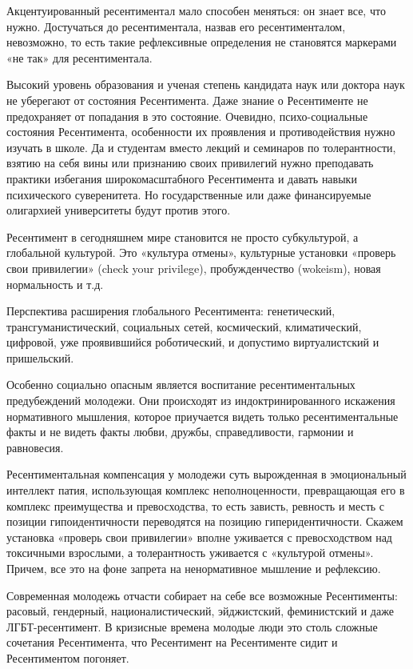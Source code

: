 Акцентуированный ресентиментал мало способен меняться: он знает все, что нужно.
Достучаться до ресентиментала, назвав его ресентименталом, невозможно, то есть
такие рефлексивные определения не становятся маркерами «не так» для
ресентиментала.

Высокий уровень образования и ученая степень кандидата наук или доктора наук не
уберегают от состояния Ресентимента. Даже знание о Ресентименте не предохраняет
от попадания в это состояние. Очевидно, психо-социальные состояния
Ресентимента, особенности их проявления и противодействия нужно изучать в
школе. Да и студентам вместо лекций и семинаров по толерантности, взятию на
себя вины или признанию своих привилегий нужно преподавать практики избегания
широкомасштабного Ресентимента и давать навыки психического суверенитета. Но
государственные или даже финансируемые олигархией университеты будут против
этого.

Ресентимент в сегодняшнем мире становится не просто субкультурой, а глобальной
культурой. Это «культура отмены», культурные установки «проверь свои
привилегии» (check your privilege), пробужденчество (wokeism), новая
нормальность и т.д.

Перспектива расширения глобального Ресентимента: генетический,
трансгуманистический, социальных сетей, космический, климатический, цифровой,
уже проявившийся роботический, и допустимо виртуалистский и пришельский.

Особенно социально опасным является воспитание ресентиментальных предубеждений
молодежи. Они происходят из индоктринированного искажения нормативного
мышления, которое приучается видеть только ресентиментальные факты и не видеть
факты любви, дружбы, справедливости, гармонии и равновесия.

Ресентиментальная компенсация у молодежи суть вырожденная в эмоциональный
интеллект патия, использующая комплекс неполноценности, превращающая его в
комплекс преимущества и превосходства, то есть зависть, ревность и месть с
позиции гипоидентичности переводятся на позицию гиперидентичности. Скажем
установка «проверь свои привилегии» вполне уживается с превосходством над
токсичными взрослыми, а толерантность уживается с «культурой отмены». Причем,
все это на фоне запрета на ненормативное мышление и рефлексию.

Современная молодежь отчасти собирает на себе все возможные Ресентименты:
расовый, гендерный, националистический, эйджистский, феминистский и даже
ЛГБТ-ресентимент. В кризисные времена молодые люди это столь сложные сочетания
Ресентимента, что Ресентимент на Ресентименте сидит и Ресентиментом погоняет.

